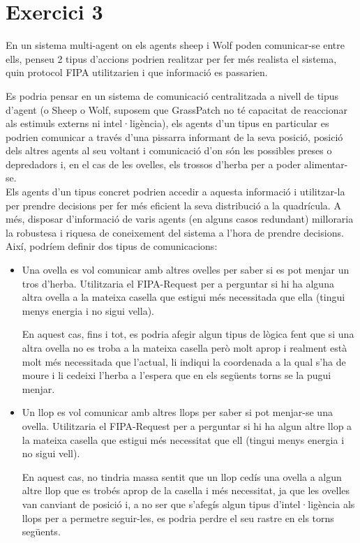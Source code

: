 \documentclass{article} %
\begin{document}
\section{Exercici 3}
En un sistema multi-agent on els agents sheep i Wolf poden comunicar-se entre ells,
penseu 2 tipus d'accions podrien realitzar per fer més realista el sistema, quin
protocol FIPA utilitzarien i que informació es passarien. \\

{\color{blue}
	Es podria pensar en un sistema de comunicació centralitzada a nivell de tipus d'agent (o Sheep o Wolf, suposem que GrassPatch no té capacitat de reaccionar als estimuls externs ni intel·ligència), els agents d'un tipus en particular es podrien comunicar a través d'una pissarra informant de la seva posició, posició dels altres agents al seu voltant i comunicació d'on són les possibles preses o depredadors i, en el cas de les ovelles, els trossos d'herba per a poder alimentar-se. \\

	Els agents d'un tipus concret podrien accedir a aquesta informació i utilitzar-la per prendre decisions per fer més eficient la seva distribució a la quadrícula. A més, disposar d’informació de varis agents (en alguns casos redundant) milloraria la robustesa i riquesa de coneixement del sistema a l’hora de prendre decisions. Així, podríem definir dos tipus de comunicacions:


	\begin{itemize}
		\item {Una ovella es vol comunicar amb altres ovelles per saber si es pot menjar un tros d'herba. Utilitzaria el FIPA-Request per a perguntar si hi ha alguna altra ovella a la mateixa casella que estigui més necessitada que ella (tingui menys energia i no sigui vella).

		En aquest cas, fins i tot, es podria afegir algun tipus de lògica fent que si una altra ovella no es troba a la mateixa casella però molt aprop i realment està molt més necessitada que l'actual, li indiqui la coordenada a la qual s'ha de moure i li cedeixi l'herba a l'espera que en els següents torns se la pugui menjar.}

		\item {Un llop es vol comunicar amb altres llops per saber si pot menjar-se una ovella. Utilitzaria el FIPA-Request per a perguntar si hi ha algun altre llop a la mateixa casella que estigui més necessitat que ell (tingui menys energia i no sigui vell). 

		En aquest cas, no tindria massa sentit que un llop cedís una ovella a algun altre llop que es trobés aprop de la casella i més necessitat, ja que les ovelles van canviant de posició i, a no ser que s'afegís algun tipus d'intel·ligència als llops per a permetre seguir-les, es podria perdre el seu rastre en els torns següents.}
	\end{itemize}
}
\end{document}
